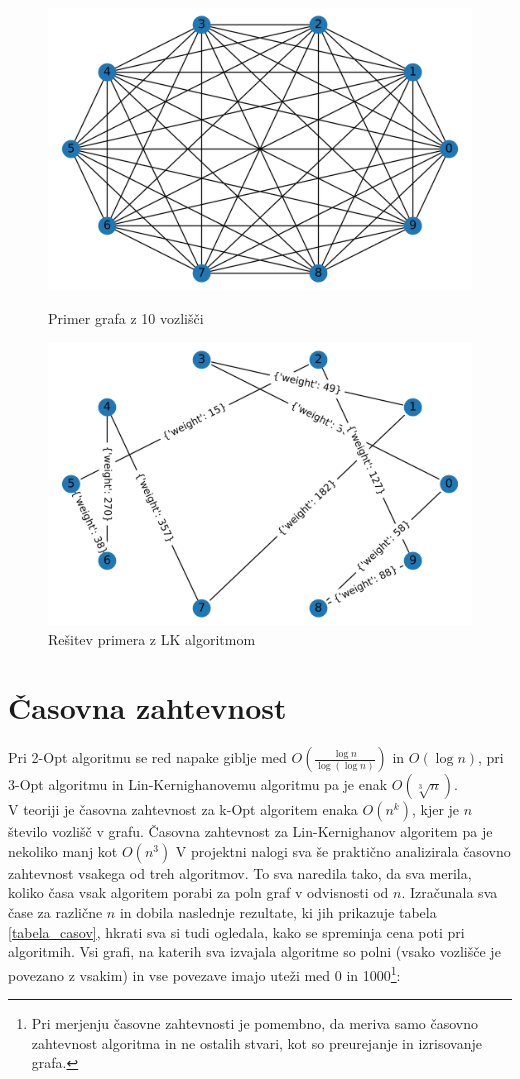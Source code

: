 \documentclass[12pt, a4paper]{article}
\begin{document}
\begin{figure}[!h]
    
    \begin{minipage}{0.5\textwidth}
    \includegraphics[width=7 cm]{primeri/primer2.png}
    \caption{Primer grafa z 10 vozlišči}
    \label{primer_LK}
  \end{minipage}
 \hspace{1cm}
  \begin{minipage}{0.5\textwidth}
    \includegraphics[width=7 cm]{primeri/primer2_lk.png}
    \caption{Rešitev primera z LK algoritmom}
    \label{resitev_LK}
  \end{minipage}
    
\end{figure}
\newpage
\section{Časovna zahtevnost} \label{Časovna zahtevnost}
Pri 2-Opt algoritmu se red napake giblje med $O(\frac{\log n}{\log (\log n)} )$ in $O(\log n)$, pri 3-Opt algoritmu in Lin-Kernighanovemu algoritmu pa je enak $O(\sqrt[3]{n})$. 
\\

V teoriji je časovna zahtevnost za k-Opt algoritem enaka $O(n^{k})$, kjer je $n$ število vozlišč v grafu. Časovna zahtevnost za Lin-Kernighanov algoritem pa je nekoliko manj kot $O(n^{3})$
V projektni nalogi sva še praktično analizirala časovno zahtevnost vsakega od treh algoritmov. To sva naredila tako, da sva merila, koliko časa vsak algoritem porabi za poln graf v odvisnosti od $n$. Izračunala sva čase za različne $n$ in dobila naslednje rezultate, ki jih prikazuje tabela \ref{tabela_casov}, hkrati sva si tudi ogledala, kako se spreminja cena poti pri algoritmih. Vsi grafi, na katerih sva izvajala algoritme so polni (vsako vozlišče je povezano z vsakim) in vse povezave imajo uteži med 0 in 1000\footnote{Pri merjenju časovne zahtevnosti je pomembno, da meriva samo časovno zahtevnost algoritma in ne ostalih stvari, kot so preurejanje in izrisovanje grafa.}:
\end{document}
